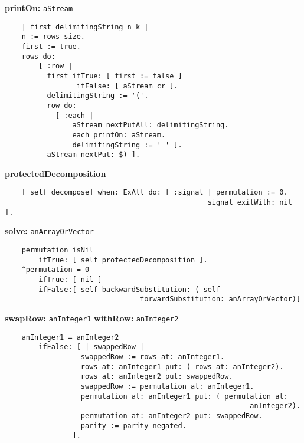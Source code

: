 {\bf printOn:} {\tt aStream}
\begin{verbatim}
    | first delimitingString n k |
    n := rows size.
    first := true.
    rows do:
        [ :row |
          first ifTrue: [ first := false ]
                 ifFalse: [ aStream cr ].
          delimitingString := '('.
          row do:
            [ :each |
                aStream nextPutAll: delimitingString.
                each printOn: aStream.
                delimitingString := ' ' ].
          aStream nextPut: $) ].
\end{verbatim}
{\bf protectedDecomposition}
\begin{verbatim}
    [ self decompose] when: ExAll do: [ :signal | permutation := 0. 
                                                signal exitWith: nil ].
\end{verbatim}
{\bf solve:} {\tt anArrayOrVector}
\begin{verbatim}
    permutation isNil
        ifTrue: [ self protectedDecomposition ].
    ^permutation = 0
        ifTrue: [ nil ]
        ifFalse:[ self backwardSubstitution: ( self 
                                forwardSubstitution: anArrayOrVector)] 
\end{verbatim}
{\bf swapRow:} {\tt anInteger1} {\bf withRow:} {\tt anInteger2}
\begin{verbatim}
    anInteger1 = anInteger2
        ifFalse: [ | swappedRow |
                  swappedRow := rows at: anInteger1.
                  rows at: anInteger1 put: ( rows at: anInteger2).
                  rows at: anInteger2 put: swappedRow.
                  swappedRow := permutation at: anInteger1.
                  permutation at: anInteger1 put: ( permutation at: 
                                                          anInteger2).
                  permutation at: anInteger2 put: swappedRow.
                  parity := parity negated.
                ].
\end{verbatim}

